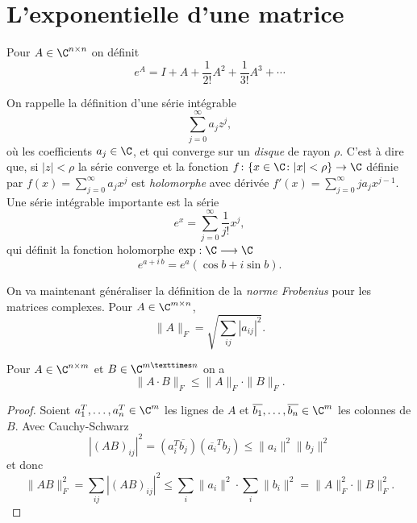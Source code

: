\section{L'exponentielle d'une matrice}
\label{sec:lexp-dune-matr}



\begin{definition}
  \label{def:28}
  Pour $A \in \C^{n \times n}$ on définit 
  \begin{displaymath}
    e^A = I + A + \frac{1}{2!} A^2 + \frac{1}{3!}A^3 + \cdots 
  \end{displaymath}
\end{definition}

\noindent On rappelle la définition d'une série intégrable 
\begin{displaymath}
  \sum_{j=0}^\infty a_j z^j,
\end{displaymath}
où les coefficients $a_j \in\C$, et
qui converge sur un \emph{disque} de rayon $\rho$. C'est à dire que, si $|z|< \rho$ la série converge et la fonction $f\colon \{x \in \C \colon |x| < \rho \}  \rightarrow \C$ définie par $f(x) = \sum_{j=0}^\infty a_j x^j $ est \emph{holomorphe} avec dérivée $f'(x) =  \sum_{j=0}^\infty j a_j x^{j-1}$. 
Une série intégrable importante est la série
\begin{displaymath}
  e^{x} = \sum_{j=0}^\infty \frac{1}{j!} x^j,
\end{displaymath}
qui définit la fonction holomorphe $\exp: \C \longrightarrow \C$ 
\begin{displaymath}
  e^{a+i\,b} = e^a (\cos b + i \sin b).  
\end{displaymath}

\noindent On va maintenant généraliser la définition de la \emph{norme Frobenius} pour les matrices complexes. Pour $A \in \C^{m\times n}$, 
\begin{displaymath}
  \|A\|_F = \sqrt{\sum_{ij} |a_{ij}|^2 }. 
\end{displaymath}

\begin{lemma}
  \label{lem:16}
  Pour $A \in \C^{n \times m}$ et $B \in \C^{m × n}$  on a 
  \begin{displaymath}
    \|A\cdot B\|_F \leq \|A\|_F\cdot \|B\|_F. 
  \end{displaymath}
\end{lemma}

  \begin{proof}Soient $a_1^T,\dots,a_n^T \in \C^m$ les lignes de $A$ et $\overline{b_1},\dots,\overline{b_n} \in \C^m$ les colonnes de $B$. Avec Cauchy-Schwarz 
    \begin{displaymath}
          |(AB)_{ij}|^2 = (a_i^T \overline{b_j})(\overline{a_i}^T b_j)  \leq \|a_i\|^2 \|b_j\|^2
    \end{displaymath}
et donc 
\begin{displaymath}
  \|AB\|_F^2 = \sum_{ij} |(AB)_{ij}|^2 \leq \sum_i\|a_i\|^2 \cdot \sum_i \|b_i\|^2 = \|A\|_F^2 \cdot \|B\|_F^2. 
\end{displaymath}
  \end{proof}


